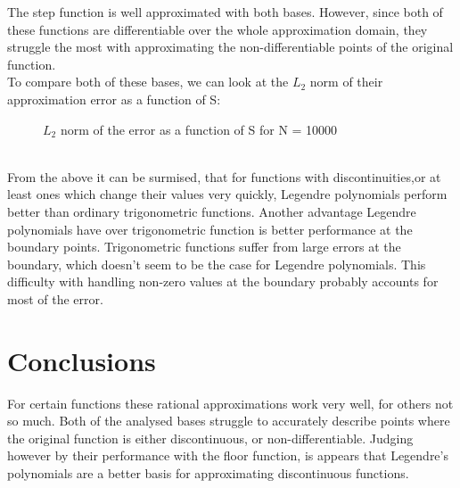 \clearpage
The step function is well approximated with both bases. However, since both of these functions are differentiable over the whole approximation domain, they struggle the most with approximating the non-differentiable points of the original function.\\
To compare both of these bases, we can look at the $L_2$ norm of their approximation error as a function of S:
\\
\begin{figure}[h!]
\begin{center}
\caption{$L_2$ norm of the error as a function of S for N = 10000}
\end{center}
\end{figure}
\\
From the above it can be surmised, that for functions with discontinuities,or at least ones which change their values very quickly, Legendre polynomials perform better than ordinary trigonometric functions. Another advantage Legendre polynomials have over trigonometric function is better performance at the boundary points. Trigonometric functions suffer from large errors at the boundary, which doesn't seem to be the case for Legendre polynomials. This difficulty with handling non-zero values at the boundary probably accounts for most of the error.





\section{Conclusions}
For certain functions these rational approximations work very well, for others not so much. Both of the analysed bases struggle to accurately describe points where the original function is either discontinuous, or non-differentiable. Judging however by their performance with the floor function, is appears that Legendre's polynomials are a better basis for approximating discontinuous functions.

